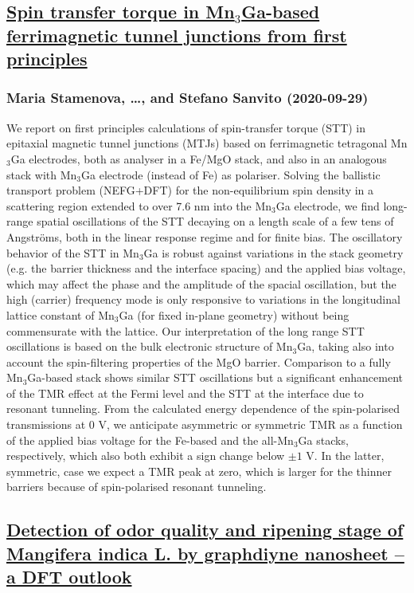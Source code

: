 \subsection*{\href{http://arxiv.org/abs/2009.14095v1}{Spin transfer torque in Mn$_3$Ga-based ferrimagnetic tunnel junctions  from first principles}}
\subsubsection*{Maria Stamenova, \dots, and Stefano Sanvito (2020-09-29)}
We report on first principles calculations of spin-transfer torque (STT) in
epitaxial magnetic tunnel junctions (MTJs) based on ferrimagnetic tetragonal
Mn$_3$Ga electrodes, both as analyser in a Fe/MgO stack, and also in an
analogous stack with Mn$_3$Ga electrode (instead of Fe) as polariser. Solving
the ballistic transport problem (NEFG+DFT) for the non-equilibrium spin density
in a scattering region extended to over 7.6 nm into the Mn$_3$Ga electrode, we
find long-range spatial oscillations of the STT decaying on a length scale of a
few tens of Angstr\"oms, both in the linear response regime and for finite
bias. The oscillatory behavior of the STT in Mn$_3$Ga is robust against
variations in the stack geometry (e.g. the barrier thickness and the interface
spacing) and the applied bias voltage, which may affect the phase and the
amplitude of the spacial oscillation, but the high (carrier) frequency mode is
only responsive to variations in the longitudinal lattice constant of Mn$_3$Ga
(for fixed in-plane geometry) without being commensurate with the lattice. Our
interpretation of the long range STT oscillations is based on the bulk
electronic structure of Mn$_3$Ga, taking also into account the spin-filtering
properties of the MgO barrier. Comparison to a fully Mn$_3$Ga-based stack shows
similar STT oscillations but a significant enhancement of the TMR effect at the
Fermi level and the STT at the interface due to resonant tunneling. From the
calculated energy dependence of the spin-polarised transmissions at 0 V, we
anticipate asymmetric or symmetric TMR as a function of the applied bias
voltage for the Fe-based and the all-Mn$_3$Ga stacks, respectively, which also
both exhibit a sign change below $\pm1$ V. In the latter, symmetric, case we
expect a TMR peak at zero, which is larger for the thinner barriers because of
spin-polarised resonant tunneling.

\subsection*{\href{http://arxiv.org/abs/2009.14092v1}{Detection of odor quality and ripening stage of Mangifera indica L. by  graphdiyne nanosheet -- a DFT outlook}}
